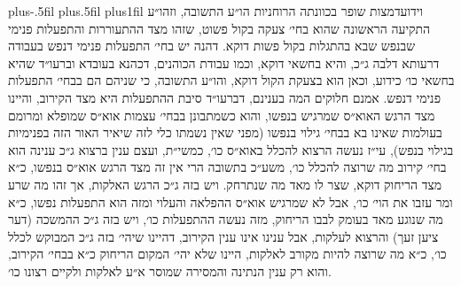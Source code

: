 \documentclass[10pt]{book}
\begin{document}
\leftskip=0pt plus-.5fil
\rightskip=0pt plus.5fil
\parfillskip=0pt plus1fil
\lettrine[findent=0.75em, nindent=0em, loversize=-0.5, lraise=0.67]{וידוע}
דמצות שופר בכוונתה הרוחניות הו״ע התשובה, וזהו״ע התקיעה הראשונה שהוא בחי׳ צעקה בקול פשוט, שזהו מצד ההתעוררות והתפעלות פנימי שבנפש שבא בהתגלות בקול פשות דוקא. דהנה יש בחי׳ התפעלות פנימי דנפש בעבודה דרעותא דלבה ג״כ, והיא בחשאי דוקא, וכמו עבודת הכוהנים, דכהנא בעובדא וברעו״ד שהיא בחשאי כו׳ כידוע, וכאן הוא בצעקת הקול דוקא, והו״ע התשובה, כי שניהם הם בבחי׳ התפעלות פנימי דנפש. אמנם חלוקים המה בענינם, דברעו״ד סיבת ההתפעלות היא מצד הקירוב, והיינו מצד הרגש האוא״ס שמרגיש בנפשו, והוא כשמתבונן בבחי׳ עצמות אוא״ס שמופלא ומרומם בעולמות שאינו בא בבחי׳ גילוי בנפשו (מפני שאין נשמתו כלי לזה שיאיר האור הזה בפנימיות בגילוי בנפש), עי״ז נעשה הרצוא להכלל באוא״ס כו׳, כמשי״ת, ועצם ענין ברצוא ג״כ ענינה הוא בחי׳ קירוב מה שרוצה להכלל כו׳, משע״כ בתשובה הרי אין זה מצד הרגש אוא״ס בנפשו, כ״א מצד הריחוק דוקא, שצר לו מאד מה שנתרחק. ויש בזה ג״כ הרגש האלקות, אך זהו מה שרע ומר עזבו את הוי׳ כו׳, אבל לא שמרגיש אוא״ס ההפלאה והעלוי ומזה הוא התפעלות נפשו, כ״א מה שנוגע מאד בעומק לבבו הריחוק, מזה נעשה ההתפעלות כו׳, ויש בזה ג״כ ההמשכה (דער ציען זעך) והרצוא לעלקות, אבל ענינו אינו ענין הקירוב, דהיינו שיהי׳ בזה ג״כ המבוקש לכלל כו׳, כ״א מה שרוצה להיות מקורב לאלקות, היינו שלא יהי׳ המקום הריחוק כ״א בבחי׳ הקירוב, והוא רק ענין הנתינה והמסירה שמוסר א״ע לאלקות ולקיים רצונו כו׳.
\end{document}
